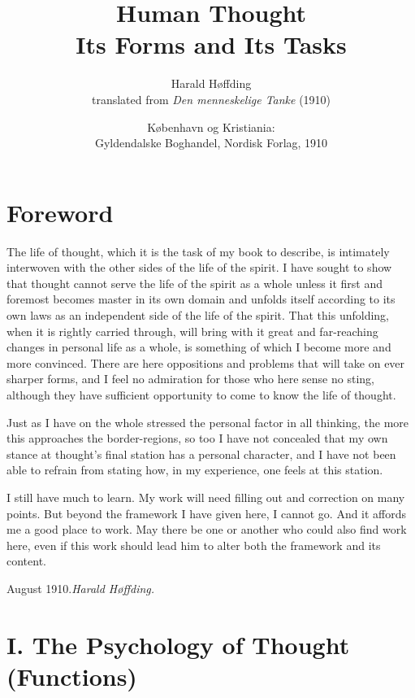 \documentclass[12pt,a4paper]{book}
\title{\textbf{Human Thought}\\[6pt]
  \large Its Forms and Its Tasks}
\author{Harald Høffding\\[6pt]
  \normalsize translated from \textit{Den menneskelige Tanke} (1910)}
\date{København og Kristiania:\\ Gyldendalske Boghandel, Nordisk Forlag, 1910}
\begin{document}
\maketitle
\thispagestyle{empty}
\newpage

\tableofcontents
\newpage

\chapter*{Foreword}
\label{ch:forord}

\noindent The life of thought, which it is the task of my book to
describe, is intimately interwoven with the other sides of the life of
the spirit. I have sought to show that thought cannot serve the life of
the spirit as a whole unless it first and foremost becomes master in
its own domain and unfolds itself according to its own laws as an
independent side of the life of the spirit. That this unfolding, when it
is rightly carried through, will bring with it great and far-reaching
changes in personal life as a whole, is something of which I become more
and more convinced. There are here oppositions and problems that will
take on ever sharper forms, and I feel no admiration for those who here
sense no sting, although they have sufficient opportunity to come to
know the life of thought.

Just as I have on the whole stressed the personal factor in all
thinking, the more this approaches the border-regions, so too I have not
concealed that my own stance at thought's final station has a personal
character, and I have not been able to refrain from stating how, in my
experience, one feels at this station.

I still have much to learn. My work will need filling out and
correction on many points. But beyond the framework I have given here, I
cannot go. And it affords me a good place to work. May there be one or
another who could also find work here, even if this work should lead him
to alter both the framework and its content.

\bigskip
\noindent August 1910.\hfill \emph{Harald Høffding.}

\chapter*{I. The Psychology of Thought (Functions)}
\label{ch:psykologi}
\end{document}
